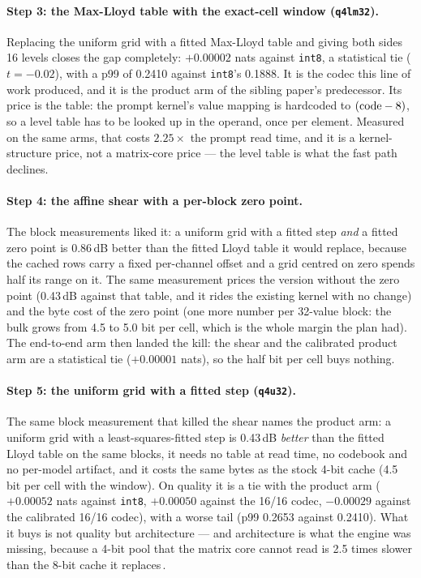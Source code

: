 \documentclass[10pt,twocolumn]{article}
\begin{document}
\paragraph{Step 3: the Max-Lloyd table with the exact-cell window (\texttt{q4lm32}).} Replacing the uniform
grid with a fitted Max-Lloyd table and giving both sides 16 levels closes the gap completely: $+0.00002$
nats against \texttt{int8}, a statistical tie ($t = -0.02$), with a p99 of 0.2410 against
\texttt{int8}'s 0.1888. It is the codec this line of work produced, and it is the product arm of the
sibling paper's predecessor. Its price is the table: the prompt kernel's value mapping is hardcoded to
$({\rm code}-8)$, so a level table has to be looked up in the operand, once per element. Measured on the
same arms, that costs $2.25\times$ the prompt read time, and it is a kernel-structure price, not a
matrix-core price --- the level table is what the fast path declines.

\paragraph{Step 4: the affine shear with a per-block zero point.} The block measurements liked it: a uniform
grid with a fitted step \emph{and} a fitted zero point is 0.86\,dB better than the fitted Lloyd table it
would replace, because the cached rows carry a fixed per-channel offset and a grid centred on zero spends
half its range on it. The same measurement prices the version without the zero point (0.43\,dB against that
table, and it rides the existing kernel with no change) and the byte cost of the zero point (one more
number per 32-value block: the bulk grows from 4.5 to 5.0 bit per cell, which is the whole margin the plan
had). The end-to-end arm then landed the kill: the shear and the calibrated product arm are a statistical
tie ($+0.00001$ nats), so the half bit per cell buys nothing.

\paragraph{Step 5: the uniform grid with a fitted step (\texttt{q4u32}).} The same block measurement that
killed the shear names the product arm: a uniform grid with a least-squares-fitted step is 0.43\,dB
\emph{better} than the fitted Lloyd table on the same blocks, it needs no table at read time, no codebook and
no per-model artifact, and it costs the same bytes as the stock 4-bit cache (4.5 bit per cell with the
window). On quality it is a tie with the product arm ($+0.00052$ nats against \texttt{int8}, $+0.00050$
against the 16/16 codec, $-0.00029$ against the calibrated 16/16 codec), with a worse tail (p99 0.2653
against 0.2410). What it buys is not quality but architecture --- and architecture is what the engine was
missing, because a 4-bit pool that the matrix core cannot read is 2.5 times slower than the 8-bit cache it
replaces\,\cite{q4u32paper}.
\end{document}
